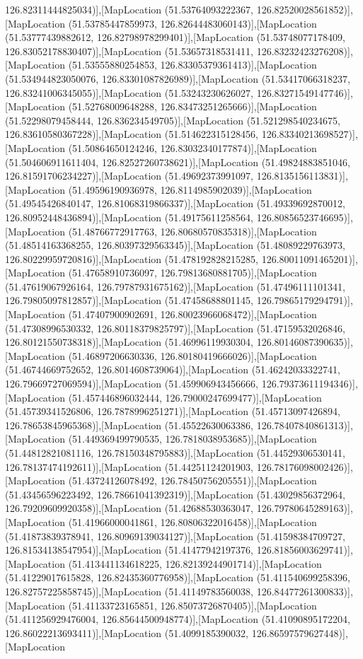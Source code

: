 126.82311444825034)],[MapLocation (51.53764093222367, 126.82520028561852)],[MapLocation (51.53785447859973, 126.82644483060143)],[MapLocation (51.53777439882612, 126.82798978299401)],[MapLocation (51.53748077178409, 126.83052178830407)],[MapLocation (51.53657318531411, 126.83232423276208)],[MapLocation (51.53555880254853, 126.83305379361413)],[MapLocation (51.534944823050076, 126.83301087826989)],[MapLocation (51.53417066318237, 126.83241006345055)],[MapLocation (51.53243230626027, 126.83271549147746)],[MapLocation (51.52768009648288, 126.83473251265666)],[MapLocation (51.52298079458444, 126.836234549705)],[MapLocation (51.521298540234675, 126.83610580367228)],[MapLocation (51.514622315128456, 126.83340213698527)],[MapLocation (51.50864650124246, 126.83032340177874)],[MapLocation (51.504606911611404, 126.82527260738621)],[MapLocation (51.49824883851046, 126.81591706234227)],[MapLocation (51.49692373991097, 126.8135156113831)],[MapLocation (51.49596190936978, 126.8114985902039)],[MapLocation (51.49545426840147, 126.81068319866337)],[MapLocation (51.49339692870012, 126.80952448436894)],[MapLocation (51.49175611258564, 126.80856523746695)],[MapLocation (51.48766772917763, 126.80680570835318)],[MapLocation (51.48514163368255, 126.80397329563345)],[MapLocation (51.48089229763973, 126.80229959720816)],[MapLocation (51.478192828215285, 126.80011091465201)],[MapLocation (51.47658910736097, 126.79813680881705)],[MapLocation (51.47619067926164, 126.79787931675162)],[MapLocation (51.47496111101341, 126.79805097812857)],[MapLocation (51.47458688801145, 126.79865179294791)],[MapLocation (51.47407900902691, 126.80023966068472)],[MapLocation (51.47308996530332, 126.80118379825797)],[MapLocation (51.47159532026846, 126.80121550738318)],[MapLocation (51.46996119930304, 126.80146087390635)],[MapLocation (51.46897206630336, 126.80180419666026)],[MapLocation (51.46744669752652, 126.8014608739064)],[MapLocation (51.46242033322741, 126.79669727069594)],[MapLocation (51.459906943456666, 126.79373611194346)],[MapLocation (51.457446896032444, 126.79000247699477)],[MapLocation (51.45739341526806, 126.7878996251271)],[MapLocation (51.45713097426894, 126.78653845965368)],[MapLocation (51.45522630063386, 126.78407840861313)],[MapLocation (51.449369499790535, 126.7818038953685)],[MapLocation (51.44812821081116, 126.78150348795883)],[MapLocation (51.44529306530141, 126.78137474192611)],[MapLocation (51.44251124201903, 126.78176098002426)],[MapLocation (51.43724126078492, 126.78450756205551)],[MapLocation (51.43456596223492, 126.78661041392319)],[MapLocation (51.43029856372964, 126.79209609920358)],[MapLocation (51.42688530363047, 126.79780645289163)],[MapLocation (51.41966000041861, 126.80806322016458)],[MapLocation (51.41873839378941, 126.80969139034127)],[MapLocation (51.41598384709727, 126.81534138547954)],[MapLocation (51.41477942197376, 126.81856003629741)],[MapLocation (51.413441134618225, 126.82139244901714)],[MapLocation (51.41229017615828, 126.82435360776958)],[MapLocation (51.411540699258396, 126.82757225858745)],[MapLocation (51.41149783560038, 126.84477261300833)],[MapLocation (51.41133723165851, 126.85073726870405)],[MapLocation (51.411256929476004, 126.85644500948774)],[MapLocation (51.41090895172204, 126.86022213693411)],[MapLocation (51.4099185390032, 126.86597579627448)],[MapLocation 